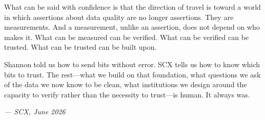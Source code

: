 \documentclass[12pt,a4paper]{article}
\begin{document}
What can be said with confidence is that the direction of travel is toward a world in which assertions about data quality are no longer assertions. They are measurements. And a measurement, unlike an assertion, does not depend on who makes it. What can be measured can be verified. What can be verified can be trusted. What can be trusted can be built upon.

Shannon told us how to send bits without error. SCX tells us how to know which bits to trust. The rest---what we build on that foundation, what questions we ask of the data we now know to be clean, what institutions we design around the capacity to verify rather than the necessity to trust---is human. It always was.

\bigskip

\begin{flushright}
\itshape
--- SCX, June 2026
\end{flushright}
\end{document}
